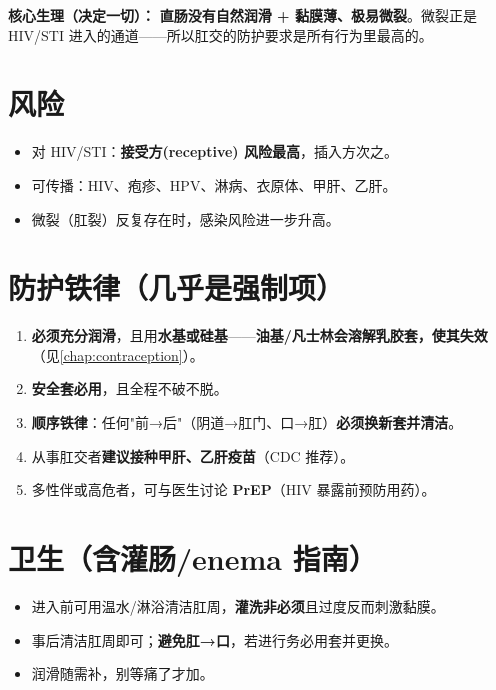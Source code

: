 \documentclass[12pt,UTF8,openany]{ctexbook}
\begin{document}
\noindent\textbf{核心生理（决定一切）：} \textbf{直肠没有自然润滑 + 黏膜薄、极易微裂}。微裂正是 HIV/STI 进入的通道——所以肛交的防护要求是所有行为里最高的。

\section{风险}

\begin{itemize}[leftmargin=2em,itemsep=0.3em]
  \item 对 HIV/STI：\textbf{接受方(receptive) 风险最高}，插入方次之。
  \item 可传播：HIV、疱疹、HPV、淋病、衣原体、甲肝、乙肝。
  \item 微裂（肛裂）反复存在时，感染风险进一步升高。
\end{itemize}

\section{防护铁律（几乎是强制项）}

\begin{enumerate}[leftmargin=2em,itemsep=0.3em]
  \item \textbf{必须充分润滑}，且用\textbf{水基或硅基}——\textbf{油基/凡士林会溶解乳胶套，使其失效}（见\ref{chap:contraception}）。
  \item \textbf{安全套必用}，且全程不破不脱。
  \item \textbf{顺序铁律}：任何"前→后"（阴道→肛门、口→肛）\textbf{必须换新套并清洁}。
  \item 从事肛交者\textbf{建议接种甲肝、乙肝疫苗}（CDC 推荐）。
  \item 多性伴或高危者，可与医生讨论 \textbf{PrEP}（HIV 暴露前预防用药）。
\end{enumerate}

\section{卫生（含灌肠/enema 指南）}

\begin{itemize}[leftmargin=2em,itemsep=0.3em]
  \item 进入前可用温水/淋浴清洁肛周，\textbf{灌洗非必须}且过度反而刺激黏膜。
  \item 事后清洁肛周即可；\textbf{避免肛→口}，若进行务必用套并更换。
  \item 润滑随需补，别等痛了才加。
\end{itemize}
\end{document}
